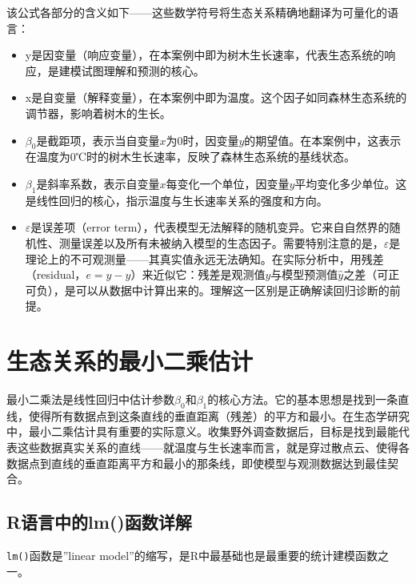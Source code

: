 \documentclass[
  twoside,12pt,fontset=none]{ctexbook}
\providecommand{\tightlist}{%
  \setlength{\itemsep}{0pt}\setlength{\parskip}{0pt}}
\begin{document}
该公式各部分的含义如下------这些数学符号将生态关系精确地翻译为可量化的语言：

\begin{itemize}
\tightlist
\item
  y是因变量（响应变量），在本案例中即为树木生长速率，代表生态系统的响应，是建模试图理解和预测的核心。
\item
  x是自变量（解释变量），在本案例中即为温度。这个因子如同森林生态系统的调节器，影响着树木的生长。
\item
  \(\beta_0\)是截距项，表示当自变量\(x\)为0时，因变量\(y\)的期望值。在本案例中，这表示在温度为0℃时的树木生长速率，反映了森林生态系统的基线状态。
\item
  \(\beta_1\)是斜率系数，表示自变量\(x\)每变化一个单位，因变量\(y\)平均变化多少单位。这是线性回归的核心，指示温度与生长速率关系的强度和方向。
\item
  \(\varepsilon\)是误差项（error term），代表模型无法解释的随机变异。它来自自然界的随机性、测量误差以及所有未被纳入模型的生态因子。需要特别注意的是，\(\varepsilon\)是理论上的不可观测量------其真实值永远无法确知。在实际分析中，用残差（residual，\(e = y - \hat{y}\)）来近似它：残差是观测值\(y\)与模型预测值\(\hat{y}\)之差（可正可负），是可以从数据中计算出来的。理解这一区别是正确解读回归诊断的前提。
\end{itemize}

\hypertarget{ux751fux6001ux5173ux7cfbux7684ux6700ux5c0fux4e8cux4e58ux4f30ux8ba1}{%
\section{生态关系的最小二乘估计}\label{ux751fux6001ux5173ux7cfbux7684ux6700ux5c0fux4e8cux4e58ux4f30ux8ba1}}

最小二乘法是线性回归中估计参数\(\beta_0\)和\(\beta_1\)的核心方法。它的基本思想是找到一条直线，使得所有数据点到这条直线的垂直距离（残差）的平方和最小。在生态学研究中，最小二乘估计具有重要的实际意义。收集野外调查数据后，目标是找到最能代表这些数据真实关系的直线------就温度与生长速率而言，就是穿过散点云、使得各数据点到直线的垂直距离平方和最小的那条线，即使模型与观测数据达到最佳契合。

\hypertarget{rux8bedux8a00ux4e2dux7684lmux51fdux6570ux8be6ux89e3}{%
\subsection{R语言中的lm()函数详解}\label{rux8bedux8a00ux4e2dux7684lmux51fdux6570ux8be6ux89e3}}

\texttt{lm()}函数是''linear model''的缩写，是R中最基础也是最重要的统计建模函数之一。
\end{document}
